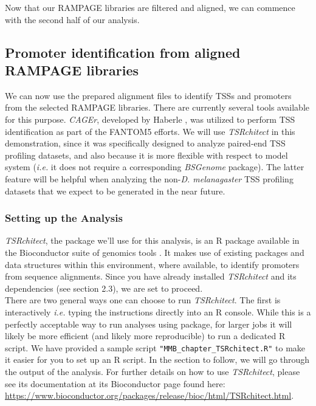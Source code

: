 \documentclass[runningheads,a4paper]{llncs}
\begin{document}
\begin{linenumbers}
Now that our RAMPAGE libraries are filtered and aligned, we can commence with the second half of our analysis.

\subsection{Promoter identification from aligned RAMPAGE libraries}

We can now use the prepared alignment files to identify TSSs and promoters from the selected RAMPAGE libraries.
There are currently several tools available for this purpose.
\textit{CAGEr}, developed by Haberle \cite{Haberle:2015fp}, was utilized to perform TSS identification as part of the FANTOM5 efforts.
We will use \textit{TSRchitect} in this demonstration, since it was specifically designed to analyze paired-end TSS profiling datasets, and also because it is more flexible with respect to model system (\textit{i.e.} it does not require a corresponding \textit{BSGenome} package).
The latter feature will be helpful when analyzing the non-\textit{D. melanagaster} TSS profiling datasets that we expect to be generated in the near future.

\subsubsection{Setting up the Analysis}
\textit{TSRchitect}, the package we'll use for this analysis, is an R package available in the Bioconductor suite of genomics tools \cite{Lawrence:2014gy}.
It makes use of existing packages and data structures within this environment, where available, to identify promoters from sequence alignments.
Since you have already installed \textit{TSRchitect} and its dependencies (see section 2.3), we are set to proceed.\\
There are two general ways one can choose to run \textit{TSRchitect}. 
The first is interactively \textit{i.e.} typing the instructions directly into an R console.
While this is a perfectly acceptable way to run analyses using package, for larger jobs it will likely be more efficient (and likely more reproducible) to run a dedicated R script.
We have provided a sample script \texttt{"MMB\_chapter\_TSRchitect.R"} to make it easier for you to set up an R script. 
In the section to follow, we will go through the output of the analysis. 
For further details on how to use \textit{TSRchitect}, please see its documentation at its Bioconductor page found here: \url{https://www.bioconductor.org/packages/release/bioc/html/TSRchitect.html}.\\


\end{linenumbers}
\end{document}
